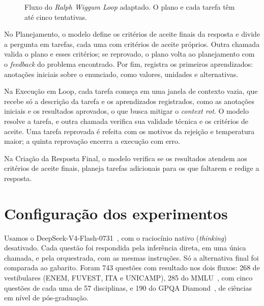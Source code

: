 \documentclass[a4paper,10pt, twocolumn]{article}
\begin{document}
\begin{figure}[H]
\caption{Fluxo do \textit{Ralph Wiggum Loop} adaptado. O plano e cada tarefa têm até cinco tentativas.}\label{fig:fluxo}
\end{figure}

No Planejamento, o modelo define os critérios de aceite finais da resposta e divide a pergunta em tarefas, cada uma com critérios de aceite próprios. Outra chamada valida o plano e esses critérios; se reprovado, o plano volta ao planejamento com o \textit{feedback} do problema encontrado. Por fim, registra os primeiros aprendizados: anotações iniciais sobre o enunciado, como valores, unidades e alternativas.

Na Execução em Loop, cada tarefa começa em uma janela de contexto vazia, que recebe só a descrição da tarefa e os aprendizados registrados, como as anotações iniciais e os resultados aprovados, o que busca mitigar o \textit{context rot}. O modelo resolve a tarefa, e outra chamada verifica sua validade técnica e os critérios de aceite. Uma tarefa reprovada é refeita com os motivos da rejeição e temperatura maior; a quinta reprovação encerra a execução com erro.

Na Criação da Resposta Final, o modelo verifica se os resultados atendem aos critérios de aceite finais, planeja tarefas adicionais para os que faltarem e redige a resposta.

\section{Configuração dos experimentos}

Usamos o DeepSeek-V4-Flash-0731~\cite{deepseek}, com o raciocínio nativo (\textit{thinking}) desativado. Cada questão foi respondida pela inferência direta, em uma única chamada, e pela orquestrada, com as mesmas instruções. Só a alternativa final foi comparada ao gabarito. Foram 743 questões com resultado nos dois fluxos: 268 de vestibulares (ENEM, FUVEST, ITA e UNICAMP), 285 do MMLU~\cite{mmlu}, com cinco questões de cada uma de 57 disciplinas, e 190 do GPQA Diamond~\cite{gpqa}, de ciências em nível de pós-graduação.
\end{document}
